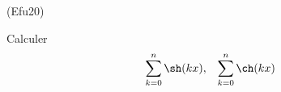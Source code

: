 \begin{tiny}(Efu20)\end{tiny} Calculer
\begin{align*}
\sum_{k=0}^{n}\sh (kx)&,& \sum_{k=0}^{n}\ch (kx)
\end{align*}